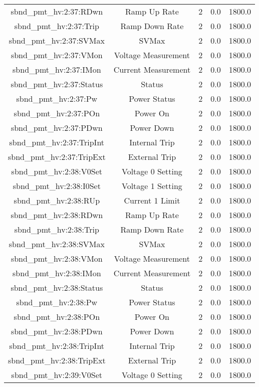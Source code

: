\begin{table}[ptb]
\begin{tabular}{c | c c c c}
sbnd_pmt_hv:2:37:RDwn & Ramp Up Rate & 2 & 0.0 & 1800.0\\ 
sbnd_pmt_hv:2:37:Trip & Ramp Down Rate & 2 & 0.0 & 1800.0\\ 
sbnd_pmt_hv:2:37:SVMax & SVMax & 2 & 0.0 & 1800.0\\ 
sbnd_pmt_hv:2:37:VMon & Voltage Measurement & 2 & 0.0 & 1800.0\\ 
sbnd_pmt_hv:2:37:IMon & Current Measurement & 2 & 0.0 & 1800.0\\ 
sbnd_pmt_hv:2:37:Status & Status & 2 & 0.0 & 1800.0\\ 
sbnd_pmt_hv:2:37:Pw & Power Status & 2 & 0.0 & 1800.0\\ 
sbnd_pmt_hv:2:37:POn & Power On & 2 & 0.0 & 1800.0\\ 
sbnd_pmt_hv:2:37:PDwn & Power Down & 2 & 0.0 & 1800.0\\ 
sbnd_pmt_hv:2:37:TripInt & Internal Trip & 2 & 0.0 & 1800.0\\ 
sbnd_pmt_hv:2:37:TripExt & External Trip & 2 & 0.0 & 1800.0\\ 
sbnd_pmt_hv:2:38:V0Set & Voltage 0 Setting & 2 & 0.0 & 1800.0\\ 
sbnd_pmt_hv:2:38:I0Set & Voltage 1 Setting & 2 & 0.0 & 1800.0\\ 
sbnd_pmt_hv:2:38:RUp & Current 1 Limit & 2 & 0.0 & 1800.0\\ 
sbnd_pmt_hv:2:38:RDwn & Ramp Up Rate & 2 & 0.0 & 1800.0\\ 
sbnd_pmt_hv:2:38:Trip & Ramp Down Rate & 2 & 0.0 & 1800.0\\ 
sbnd_pmt_hv:2:38:SVMax & SVMax & 2 & 0.0 & 1800.0\\ 
sbnd_pmt_hv:2:38:VMon & Voltage Measurement & 2 & 0.0 & 1800.0\\ 
sbnd_pmt_hv:2:38:IMon & Current Measurement & 2 & 0.0 & 1800.0\\ 
sbnd_pmt_hv:2:38:Status & Status & 2 & 0.0 & 1800.0\\ 
sbnd_pmt_hv:2:38:Pw & Power Status & 2 & 0.0 & 1800.0\\ 
sbnd_pmt_hv:2:38:POn & Power On & 2 & 0.0 & 1800.0\\ 
sbnd_pmt_hv:2:38:PDwn & Power Down & 2 & 0.0 & 1800.0\\ 
sbnd_pmt_hv:2:38:TripInt & Internal Trip & 2 & 0.0 & 1800.0\\ 
sbnd_pmt_hv:2:38:TripExt & External Trip & 2 & 0.0 & 1800.0\\ 
sbnd_pmt_hv:2:39:V0Set & Voltage 0 Setting & 2 & 0.0 & 1800.0\\ 

\end{tabular}
\end{table}

